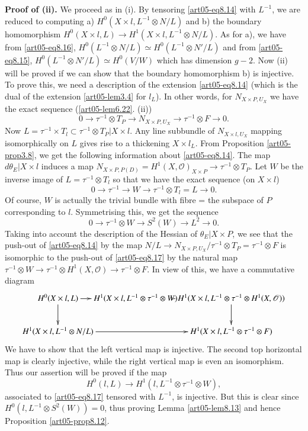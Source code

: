 \medskip
\noindent
{\bf Proof of (ii).}
We\pageoriginale
proceed as in (i). By tensoring \ref{art05-eq8.14} with $L^{-1}$, we
are reduced to computing a) $H^{0}(X\times l, L^{-1}\otimes N/L)$ and
b) the boundary homomorphism $H^{0}(X\times l,L)\to H^{1}(X\times l,
L^{-1}\otimes N/L)$. As for a), we have from \ref{art05-eq8.16},
$H^{0}(L^{-1}\otimes N/L)\simeq H^{0}(L^{-1}\otimes N'/L)$ and from 
\ref{art05-eq8.15}, $H^{0}(L^{-1}\otimes N'/L)\simeq H^{0}(V/W)$ which
has dimension $g-2$. Now (ii) will be proved if we can show that the
boundary homomorphism b) is injective. To prove this, we need a
description of the extension \ref{art05-eq8.14} (which is the dual of
the extension \ref{art05-lem3.4} for $l_{L}$). In other words, for
$N_{X\times P,U_{X}}$ we have the exact sequence
(\ref{art05-lem6.22}. (ii))
$$
0\to \tau^{-1}\otimes T_{P}\to N_{X\times P,U_{X}}\to \tau^{-1}\otimes
F\to 0.
$$
Now $L=\tau^{-1}\times T_{l}\subset \tau^{-1}\otimes T_{P}|X\times
l$. Any line subbundle of $N_{X\times l,U_{X}}$ mapping isomorphically
on $L$ gives rise to a thickening $X\times l_{L}$. From
Proposition \ref{art05-prop3.8}, we get the following information
about \ref{art05-eq8.14}. The map $d\theta_{E}|X\times l$ induces a
map $N_{X\times P,P(D)}=H^{1}(X,\mathscr{O})_{X\times
P}\to \tau^{-1}\otimes T_{P}$. Let $W$ be the inverse image of
$L=\tau^{-1}\otimes T_{l}$ so that we have the exact sequence (on
$X\times l$)
$$
0\to \tau^{-1}\to W\to \tau^{-1}\otimes T_{l}=L\to 0.
$$
Of course, $W$ is actually the trivial bundle with fibre = the
subspace of $P$ corresponding to $l$. Symmetrising this, we get the
sequence
\setcounter{equation}{16}
\begin{equation}
0\to\tau^{-1}\otimes W\to S^{2}(W)\to L^{2}\to 0.\label{art05-eq8.17}
\end{equation}
Taking into account the description of the Hessian of
$\theta_{E}|X\times P$, we see that the push-out
of \eqref{art05-eq8.14} by the map $N/L\to N_{X\times
P,U_{X}}/\tau^{-1}\otimes T_{P}=\tau^{-1}\otimes F$ is isomorphic to
the push-out of \eqref{art05-eq8.17}  by the natural map
$\tau^{-1}\otimes W\to \tau^{-1}\otimes
H^{1}(X,\mathscr{O})\to \tau^{-1}\otimes F$. In view of this, we have
a commutative diagram
{\fontsize{9pt}{11pt}\selectfont
\[
\xymatrix@C=-.2cm{
H^{0}(X\times l,L)\ar[r]\ar[d] & H^{1}(X\times l,
L^{-1}\otimes \tau^{-1}\otimes W)\ar[r] & H^{1}(X\times
l,L^{-1}\otimes \tau^{-1}\otimes H^{1}(X,\mathscr{O}))\ar[d]\\
H^{1}(X\times l, L^{-1}\otimes N/L)\ar[rr] && H^{1}(X\times l,
L^{-1}\otimes \tau^{-1}\otimes F)
}
\]}
We have to show that the left vertical map is injective. The second
top horizontal map is clearly injective, while the right vertical map
is even an isomorphism. Thus our assertion will be proved if the map
$$
H^{0}(l,L)\to H^{1}(l,L^{-1}\otimes \tau^{-1}\otimes W),
$$\pageoriginale
associated to \eqref{art05-eq8.17} tensored with $L^{-1}$, is
injective. But this is clear since $H^{0}(l,L^{-1}\otimes
S^{2}(W))=0$, thus proving Lemma \ref{art05-lem8.13} and hence
Proposition \ref{art05-prop8.12}.


